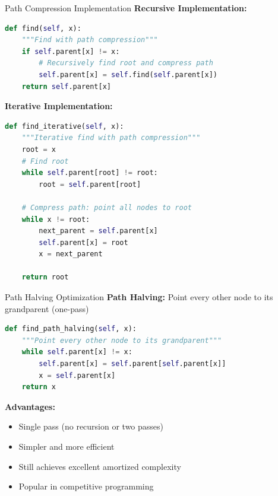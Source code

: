 \documentclass[aspectratio=169]{beamer}
\begin{document}
\begin{frame}[fragile]{Path Compression Implementation}
  \textbf{Recursive Implementation:}
  \begin{lstlisting}[language=Python, basicstyle=\ttfamily\footnotesize]
def find(self, x):
    """Find with path compression"""
    if self.parent[x] != x:
        # Recursively find root and compress path
        self.parent[x] = self.find(self.parent[x])
    return self.parent[x]
  \end{lstlisting}

  \vspace{0.5cm}
  \textbf{Iterative Implementation:}
  \begin{lstlisting}[language=Python, basicstyle=\ttfamily\footnotesize]
def find_iterative(self, x):
    """Iterative find with path compression"""
    root = x
    # Find root
    while self.parent[root] != root:
        root = self.parent[root]

    # Compress path: point all nodes to root
    while x != root:
        next_parent = self.parent[x]
        self.parent[x] = root
        x = next_parent

    return root
  \end{lstlisting}
\end{frame}

\begin{frame}[fragile]{Path Halving Optimization}
  \textbf{Path Halving:} Point every other node to its grandparent (one-pass)

  \begin{lstlisting}[language=Python, basicstyle=\ttfamily\footnotesize]
def find_path_halving(self, x):
    """Point every other node to its grandparent"""
    while self.parent[x] != x:
        self.parent[x] = self.parent[self.parent[x]]
        x = self.parent[x]
    return x
  \end{lstlisting}

  \vspace{0.5cm}
  \textbf{Advantages:}
  \begin{itemize}
    \item Single pass (no recursion or two passes)
    \item Simpler and more efficient
    \item Still achieves excellent amortized complexity
    \item Popular in competitive programming
  \end{itemize}
\end{frame}
\end{document}
